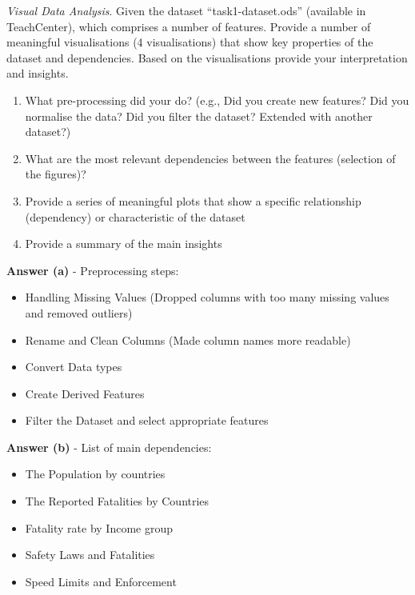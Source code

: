 \documentclass[a4paper,10pt]{article}\setlength{\textheight}{10in}\setlength{\textwidth}{6.5in}\setlength{\topmargin}{-0.125in}\setlength{\oddsidemargin}{-.2in}\setlength{\evensidemargin}{-.2in}\setlength{\headsep}{0.2in}\setlength{\footskip}{0pt}\usepackage{amsmath}\usepackage{fancyhdr}\usepackage{enumitem}\usepackage{hyperref}\usepackage{xcolor}\usepackage{graphicx}\usepackage[export]{adjustbox}\usepackage{caption}\usepackage{float}\usepackage{booktabs}\usepackage{makecell}\pagestyle{fancy}
\begin{document}
\begin{enumerate}[topsep=0mm, partopsep=0mm, leftmargin=*]





{\color{blue}
\item\textit{Visual Data Analysis}. Given the dataset ``task1-dataset.ods'' (available in TeachCenter), which comprises a number of features. Provide a number of meaningful visualisations (4 visualisations) that show key properties of the dataset and dependencies. Based on the visualisations provide your interpretation and insights. 
\begin{enumerate}
	\item What pre-processing did your do? (e.g., Did you create new features? Did you normalise the data? Did you filter the dataset? Extended with another dataset?)
	\item What are the most relevant dependencies between the features (selection of the figures)?
	\item Provide a series of meaningful plots that show a specific relationship (dependency) or characteristic of the dataset
	\item Provide a summary of the main insights
\end{enumerate}
}


\textbf{Answer (a)} - Preprocessing steps:
    \begin{itemize}
        \item Handling Missing Values (Dropped columns with too many missing values and removed outliers)
        \item Rename and Clean Columns (Made column names more readable)
        \item Convert Data types 
        \item Create Derived Features
        \item Filter the Dataset and select appropriate features
    \end{itemize}
    
\textbf{Answer (b)} - List of main dependencies:
    \begin{itemize}
        \item The Population by countries
        \item The Reported Fatalities by Countries
        \item Fatality rate by Income group
        \item Safety Laws and Fatalities
        \item Speed Limits and Enforcement
    \end{itemize}
    

\end{enumerate}
\end{document}
